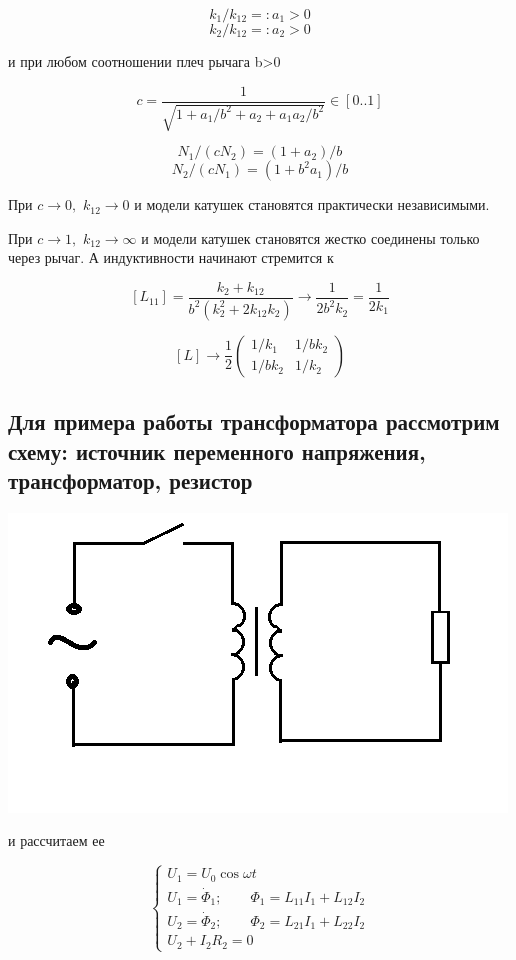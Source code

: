 \documentclass[11pt]{article} %
\begin{document}
$$k_1/k_{12} =: a_1 >0$$
$$k_2/k_{12} =: a_2 >0$$

и при любом соотношении плеч рычага b>0

$$c=\frac{1}{\sqrt{1+a_1/b^2 +a_2+a_1a_2/b^2}} \in [0..1]$$

$$N_1/(cN_2) = (1+a_2)/b$$
$$N_2/(cN_1) = (1+b^2a_1)/b$$

При $c\to0,$ $k_{12}\to0$ и модели катушек становятся практически независимыми.

При $c\to1,$ $k_{12}\to\infty$ и модели катушек становятся жестко соединены только через рычаг. А индуктивности начинают стремится к

$$[L_{11}]=\frac{k_2+k_{12}}{b^2(k_2^2+2k_{12}k_2)}\to \frac{1}{2b^2k_2}=\frac{1}{2k_1}$$

$$[L]\to
\frac{1}{2}
\begin{pmatrix}
1/k_1	& 1/bk_2\\
1/bk_2	& 1/k_2
\end{pmatrix}
$$

\subsection{Для примера работы трансформатора рассмотрим схему: источник переменного напряжения, трансформатор, резистор}

\includegraphics{../TR.png}

и рассчитаем ее

$$
\begin{cases}
U_1=U_0 \cos \omega t\\
U_1=\dot \Phi_1; \qquad \Phi_1=L_{11}I_1+L_{12}I_2\\
U_2=\dot \Phi_2; \qquad \Phi_2=L_{21}I_1+L_{22}I_2\\
U_2+I_2R_2=0
\end{cases}
$$
\end{document}
